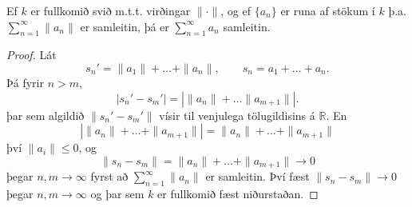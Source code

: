 \begin{setn}
Ef $k$ er fullkomið svið m.t.t. virðingar $\| \cdot \|$, og ef $\{ a_n \}$ er runa af stökum í $k$ 
þ.a. $\sum_{n=1}^{\infty} \| a_n \| $ er samleitin, þá er $\sum_{n=1}^\infty a_n $ samleitin. 
\end{setn}
\begin{proof}
Lát 
\begin{equation*}
 s_n' = \| a_1 \| + \ldots + \|a_n\|, \qquad s_n = a_1 + \ldots + a_n.
\end{equation*}
Þá fyrir $n>m$, 
\begin{equation*}
|s_n'- s_m' | = | \| a_n \| + \ldots \|a_{m+1}\| |.
\end{equation*}
þar sem algildið $\| s_n' - s_m' \| $ vísir til venjulega  tölugildisins á $\mathbb{R}$. En 
\begin{equation*}
| \| a_n \| + \ldots + \| a_{m+1} \| | = \| a_n \| + \ldots + \| a_{m+1} \|
\end{equation*}
því $\| a_i \| \leq 0$, og 
\begin{equation}
\| s_n - s_m \| = \|a_n\| + \ldots + \|a_{m+1}\| \rightarrow 0
\end{equation}
þegar $n,m \rightarrow \infty$ fyrst að $\sum_{n=1}^\infty \|a_n\|$ er samleitin. 
Því fæst $\|s_n - s_m \| \rightarrow 0$ þegar $n,m \rightarrow \infty $ og þar sem $k$ er fullkomið fæst niðurstaðan.  
\end{proof}

